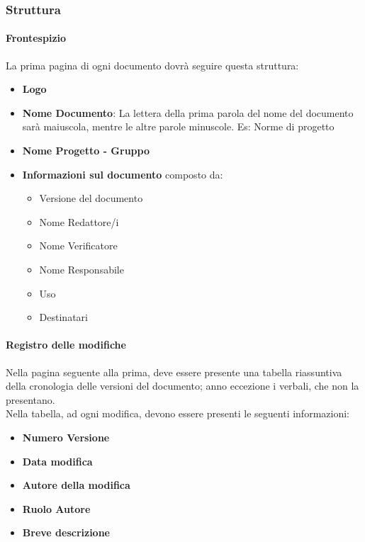 \documentclass[11pt,a4paper]{article}
\begin{document}
{	\subsubsection{Struttura}
	
	\paragraph{Frontespizio} 
	La prima pagina di ogni documento dovrà seguire questa struttura:
	\begin{itemize}
		\item \textbf{Logo}
		\item \textbf{Nome Documento}: La lettera della prima parola del nome del documento sarà maiuscola, mentre le altre parole minuscole. Es: Norme di progetto
		\item \textbf{Nome Progetto - Gruppo}
		\item \textbf{Informazioni sul documento} composto da:
		\begin{itemize}
			\item Versione del documento 
			\item Nome Redattore/i
			\item Nome Verificatore
			\item Nome Responsabile
			\item Uso
			\item Destinatari
		\end{itemize}
	\end{itemize}
	
	\paragraph{Registro delle modifiche\\}
	Nella pagina seguente alla prima, deve essere presente una tabella riassuntiva della cronologia delle versioni del documento; anno eccezione i verbali, che non la presentano. \\
	Nella tabella, ad ogni modifica, devono essere presenti le seguenti informazioni:
	
	\begin{itemize}
		\item \textbf{Numero Versione}
		\item \textbf{Data modifica}
		\item \textbf{Autore della modifica}
		\item \textbf{Ruolo Autore}
		\item \textbf{Breve descrizione}
	\end{itemize}
	
}
\end{document}
